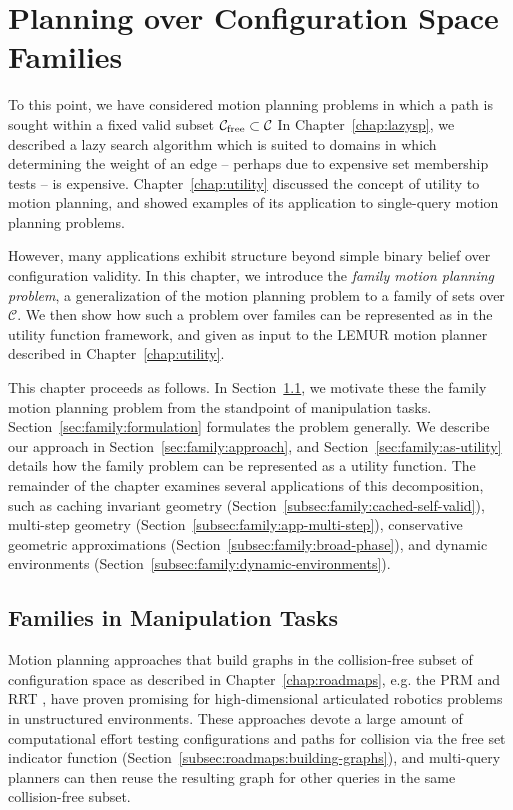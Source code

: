 \chapter{Planning over Configuration Space Families}
\label{chap:family}

To this point,
we have considered motion planning problems in which a path is sought
within a fixed valid subset
$\mathcal{C}_{\mbox{\scriptsize free}} \subset \mathcal{C}$
In Chapter~\ref{chap:lazysp},
we described a lazy search algorithm which is suited to domains in
which determining the weight of an edge
-- perhaps due to expensive set membership tests --
is expensive.
Chapter~\ref{chap:utility} discussed the concept of utility to
motion planning,
and showed examples of its application to single-query motion
planning problems.

However,
many applications exhibit structure beyond simple binary belief over
configuration validity.
In this chapter,
we introduce the \emph{family motion planning problem},
a generalization of the motion planning problem to a family of sets
over $\mathcal{C}$.
We then show how such a problem over familes can be represented
as in the utility function framework,
and given as input to the LEMUR motion planner described
in Chapter~\ref{chap:utility}.

This chapter proceeds as follows.
In Section~\ref{sec:family:families-in-manipulation},
we motivate these the family motion planning problem
from the standpoint of manipulation tasks.
Section~\ref{sec:family:formulation} formulates the problem
generally.
We describe our approach in Section~\ref{sec:family:approach},
and Section~\ref{sec:family:as-utility} details how the family
problem can be represented as a utility function.
The remainder of the chapter examines several applications
of this decomposition,
such as caching invariant geometry
(Section~\ref{subsec:family:cached-self-valid}),
multi-step geometry (Section~\ref{subsec:family:app-multi-step}),
conservative geometric approximations
(Section~\ref{subsec:family:broad-phase}),
and dynamic environments
(Section~\ref{subsec:family:dynamic-environments}).

\section{Families in Manipulation Tasks}
\label{sec:family:families-in-manipulation}

Motion planning approaches that build graphs
in the collision-free subset of
configuration space as described in Chapter~\ref{chap:roadmaps},
e.g. the
PRM \citep{kavrakietal1996prm}
and RRT \citep{lavallekuffner1999rrt},
have proven promising
for high-dimensional articulated robotics problems
in unstructured environments.
These approaches devote a large amount of computational effort
testing configurations and paths for collision
via the free set indicator function
(Section~\ref{subsec:roadmaps:building-graphs}),
and multi-query planners can then reuse the resulting graph
for other queries in the same collision-free subset.

